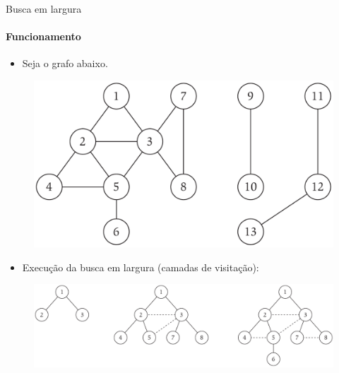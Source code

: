 \begin{frame}{Busca em largura}
	\framesubtitle{Funcionamento}

	\begin{itemize}
		\item Seja o grafo abaixo.
	\end{itemize}
	
	\vspace{-8pt}
	
	\begin{figure}
		\centering
		\includegraphics[width=0.25\linewidth,trim={0 0 15cm 0},clip]{img/conectividade}
	\end{figure}
	
	\vspace{-8pt}
	
	\begin{itemize}
		\item Execução da busca em largura (camadas de visitação):
	\end{itemize}
	
	\vspace{-2pt}
	
	\begin{figure}
		\centering
		\includegraphics[width=0.9\linewidth,trim={0 0 0 0},clip]{img/busca-largura}
	\end{figure}
\end{frame}



%
%		
%		
%		
%		
%



